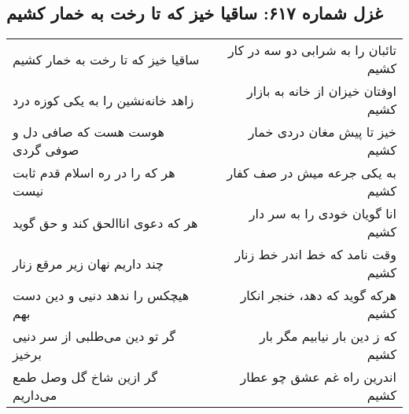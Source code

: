 \begin{center}
\section*{غزل شماره ۶۱۷: ساقیا خیز که تا رخت به خمار کشیم}
\label{sec:617}
\begin{longtable}{l p{0.5cm} r}
ساقیا خیز که تا رخت به خمار کشیم
&&
تائبان را به شرابی دو سه در کار کشیم
\\
زاهد خانه‌نشین را به یکی کوزه درد
&&
اوفتان خیزان از خانه به بازار کشیم
\\
هوست هست که صافی دل و صوفی گردی
&&
خیز تا پیش مغان دردی خمار کشیم
\\
هر که را در ره اسلام قدم ثابت نیست
&&
به یکی جرعه میش در صف کفار کشیم
\\
هر که دعوی اناالحق کند و حق گوید
&&
انا گویان خودی را به سر دار کشیم
\\
چند داریم نهان زیر مرقع زنار
&&
وقت نامد که خط اندر خط زنار کشیم
\\
هیچکس را ندهد دنیی و دین دست بهم
&&
هرکه گوید که دهد، خنجر انکار کشیم
\\
گر تو دین می‌طلبی از سر دنیی برخیز
&&
که ز دین بار نیابیم مگر بار کشیم
\\
گر ازین شاخ گل وصل طمع می‌داریم
&&
اندرین راه غم عشق چو عطار کشیم
\\
\end{longtable}
\end{center}
